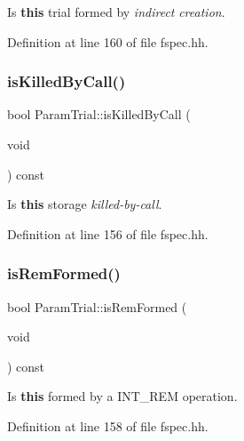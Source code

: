 Is {\bfseries{this}} trial formed by {\itshape indirect} {\itshape creation}. 



Definition at line 160 of file fspec.\+hh.

\mbox{\label{class_param_trial_af67e7b4a445f7069a2680c63afe0a28c}} 
\subsubsection{\texorpdfstring{isKilledByCall()}{isKilledByCall()}}
{\footnotesize\ttfamily bool Param\+Trial\+::is\+Killed\+By\+Call (\begin{DoxyParamCaption}\item[{void}]{ }\end{DoxyParamCaption}) const\hspace{0.3cm}{\ttfamily [inline]}}



Is {\bfseries{this}} storage {\itshape killed-\/by-\/call}. 



Definition at line 156 of file fspec.\+hh.

\mbox{\label{class_param_trial_a997491aac899992e8b17459b06af0149}} 
\subsubsection{\texorpdfstring{isRemFormed()}{isRemFormed()}}
{\footnotesize\ttfamily bool Param\+Trial\+::is\+Rem\+Formed (\begin{DoxyParamCaption}\item[{void}]{ }\end{DoxyParamCaption}) const\hspace{0.3cm}{\ttfamily [inline]}}



Is {\bfseries{this}} formed by a I\+N\+T\+\_\+\+R\+EM operation. 



Definition at line 158 of file fspec.\+hh.

\mbox{\label{class_param_trial_a13bb1c434cce645e25a0a26359d6c889}} 
